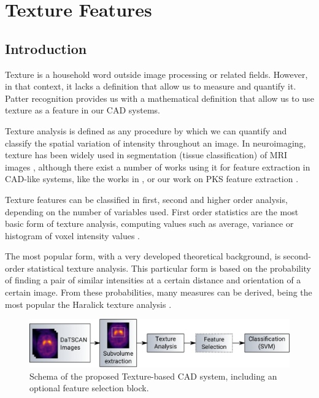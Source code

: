 \chapter{Texture Features}\label{ch:texture}
\section{Introduction}
Texture is a household word outside image processing or related fields. However, in that context, it lacks a definition that allow us to measure and quantify it. Patter recognition provides us with a mathematical definition that allow us to use texture as a feature in our \ac{CAD} systems. 

Texture analysis is defined as any procedure by which we can quantify and classify the spatial variation of intensity throughout an image. In neuroimaging, texture has been widely used in segmentation (tissue classification) of \ac{MRI} images \cite{Saeed2002,Alejo2003,Wang2009}, although there exist a number of works using it for feature extraction in \ac{CAD}-like systems, like the works in \cite{kovalev2001three,sikio2015mr}, or our work on \ac{PKS} feature extraction \cite{Martinez-Murcia2013266,martinez2014parametrization}. 

Texture features can be classified in first, second and higher order analysis, depending on the number of variables used. First order statistics \cite{Martinez-Murcia2016b} are the most basic form of texture analysis, computing values such as average, variance or histogram of voxel intensity values \cite{Srinivasan2008}. 

The most popular form, with a very developed theoretical background, is second-order statistical texture analysis. This particular form is based on the probability of finding a pair of similar intensities at a certain distance and orientation of a certain image. From these probabilities, many measures can be derived, being the most popular the Haralick texture analysis \cite{Haralick73}. 

\begin{figure}[htp]
\centering
\includegraphics[width=0.9\linewidth]{Graphics/ch5/01-flowdiagram}
\caption[Schema of the proposed Texture-based CAD system.]{Schema of the proposed Texture-based \ac{CAD} system, including an optional feature selection block.}
\label{fig:textureCAD}
\end{figure}

